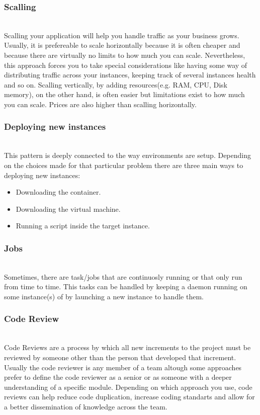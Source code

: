 \documentclass{llncs}
\begin{document}
    \subsubsection{Scalling}~\\
    Scalling your application will help you handle traffic as your business grows.
    Usually, it is prefereable to scale horizontally because it is often cheaper and because there are virtually no limits to how much you can scale. Nevertheless, this approach forces you to take special considerations like having some way of distributing traffic across your instances, keeping track of several instances health and so on.
    Scalling vertically, by adding resources(e.g. RAM, CPU, Disk memory), on the other hand, is often easier but limitations exist to how much you can scale. Prices are also higher than scalling horizontally.

    \subsubsection{Deploying new instances}~\\
    This pattern is deeply connected to the way environments are setup. Depending on the choices made for that particular problem there are three main ways to deploying new instances:
    \begin{itemize}
      \item Downloading the container.
      \item Downloading the virtual machine.
      \item Running a script inside the target instance.
    \end{itemize}

    \subsubsection{Jobs}~\\
    Sometimes, there are task/jobs that are continuosly running or that only run from time to time. This tasks can be handled by keeping a daemon running on some instance(s) of by launching a new instance to handle them.

    \subsubsection{Code Review}~\\
    Code Reviews are a process by which all new increments to the project must be reviewed by someone other than the person that developed that increment. Usually the code reviewer is any member of a team altough some approaches prefer to define the code reviewer as a senior or as someone with a deeper understanding of a specific module.
    Depending on which approach you use, code reviews can help reduce code duplication, increase coding standarts and allow for a better dissemination of knowledge across the team.
\end{document}
